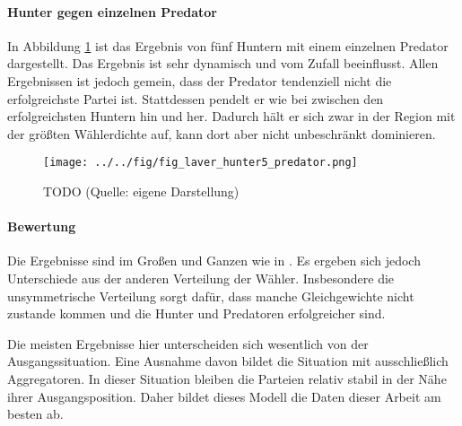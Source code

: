 \paragraph{Hunter gegen einzelnen Predator}

In Abbildung \ref{fig:laver-hunter5-predator} ist das Ergebnis von fünf Huntern mit einem einzelnen Predator dargestellt. Das Ergebnis ist sehr dynamisch und vom Zufall beeinflusst. Allen Ergebnissen ist jedoch gemein, dass der Predator tendenziell nicht die erfolgreichste Partei ist. Stattdessen pendelt er wie bei \citet{laver2005policy} zwischen den erfolgreichsten Huntern hin und her. Dadurch hält er sich zwar in der Region mit der größten Wählerdichte auf, kann dort aber nicht unbeschränkt dominieren.

\begin{figure}[htb]
	\centering
	\texttt{[image: ../../fig/fig\_laver\_hunter5\_predator.png]}
	\caption{TODO (Quelle: eigene Darstellung)}
	\label{fig:laver-hunter5-predator}
\end{figure}

\paragraph{Bewertung}

Die Ergebnisse sind im Großen und Ganzen wie in \citet{laver2005policy}. Es ergeben sich jedoch Unterschiede aus der anderen Verteilung der Wähler. Insbesondere die unsymmetrische Verteilung sorgt dafür, dass manche Gleichgewichte nicht zustande kommen und die Hunter und Predatoren erfolgreicher sind.

Die meisten Ergebnisse hier unterscheiden sich wesentlich von der Ausgangssituation. Eine Ausnahme davon bildet die Situation mit ausschließlich Aggregatoren. In dieser Situation bleiben die Parteien relativ stabil in der Nähe ihrer Ausgangsposition. Daher bildet dieses Modell die Daten dieser Arbeit am besten ab.
